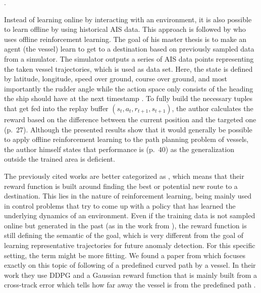 \cite[pp.~21-26]{s20020426}.
\par 
Instead of learning online by interacting with an environment, it is also possible to learn offline by using historical AIS data. This approach is followed by \cite{westerlund2021learning} who uses offline reinforcement learning. The goal of his master thesis is to make an agent (the vessel) learn to get to a destination based on previously sampled data from a simulator. The simulator outputs a series of AIS data points representing the taken vessel trajectories, which is used as data set. Here, the state is defined by latitude, longitude, speed over ground, course over ground, and most importantly the rudder angle while the action space only consists of the heading the ship should have at the next timestamp \cite[pp.~30-33]{westerlund2021learning}. To fully build the necessary tuples that get fed into the replay buffer $(s_t, a_t, r_{t+1}, s_{t+1})$, the author calculates the reward based on the difference between the current position and the targeted one (p.~27). Although the presented results show that it would generally be possible to apply offline reinforcement learning to the path planning problem of vessels, the author himself states that performance is (p.~40) as the generalization outside the trained area is deficient.
\par
The previously cited works are better categorized as , which means that their reward function is built around finding the best or potential new route to a destination. This lies in the nature of reinforcement learning, being mainly used in control problems that try to come up with a policy that has learned the underlying dynamics of an environment. Even if the training data is not sampled online but generated in the past (as in the work  from \cite{westerlund2021learning}), the reward function is still defining the semantic of the goal, which is very different from the goal of learning representative trajectories for future anomaly detection. For this specific setting, the term  might be more fitting. We found a paper from \cite{martinsen2018curved} which focuses exactly on this topic of following of a predefined curved path by a vessel. In their work they use DDPG and a Gaussian reward function that is mainly built from a cross-track error which tells how far away the vessel is from the predefined path \cite[p.~3]{martinsen2018curved}. 